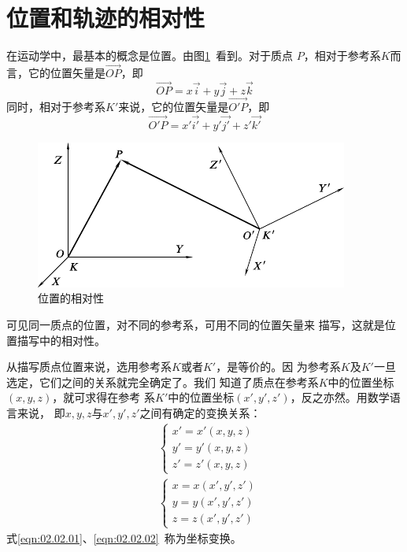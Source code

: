 \section{位置和轨迹的相对性}\label{sec:02.02}

在运动学中，最基本的概念是位置。由图\ref{fig:02.01}~看到。对于质点
$P$，相对于参考系$K$而言，它的位置矢量是$\vec{OP}$，即
\begin{equation*}
  \vec{OP}=x\vec{i}+y\vec{j}+z\vec{k}
\end{equation*}
同时，相对于参考系$K'$来说，它的位置矢量是$\vec{O'P}$，即
\begin{equation*}
  \vec{O'P}=x'\vec{i'}+y'\vec{j'}+z'\vec{k'}
\end{equation*}
\begin{figure}[h]
  \vspace{-1em}
  \centering
  \includegraphics{figure/fig02.01}
  \caption{位置的相对性}
  \label{fig:02.01}
\end{figure}

\clearpage
可见同一质点的位置，对不同的参考系，可用不同的位置矢量来
描写，这就是位置描写中的相对性。

从描写质点位置来说，选用参考系$ K $或者$ K' $，是等价的。因
为参考系$K$及$K'$一旦选定，它们之间的关系就完全确定了。我们
知道了质点在参考系$K$中的位置坐标$\left(x,y,z\right)$，就可求得在参考
系$K'$中的位置坐标$\left(x',y',z'\right)$，反之亦然。用数学语言来说，
即$x,y,z$与$x',y',z'$之间有确定的变换关系：
\begin{align}
  \label{eqn:02.02.01}
   & \left\{\begin{array}{l}
              x'=x'\left(x, y, z\right) \\
              y'=y'\left(x, y, z\right) \\
              z'=z'\left(x, y, z\right)
            \end{array}\right.  \\
  \label{eqn:02.02.02}
   & \left\{\begin{array}{l}
              x=x\left(x', y', z'\right) \\
              y=y\left(x', y', z'\right) \\
              z=z\left(x', y', z'\right)
            \end{array}\right.
\end{align}
式\eqref{eqn:02.02.01}、\eqref{eqn:02.02.02}~称为坐标变换。

